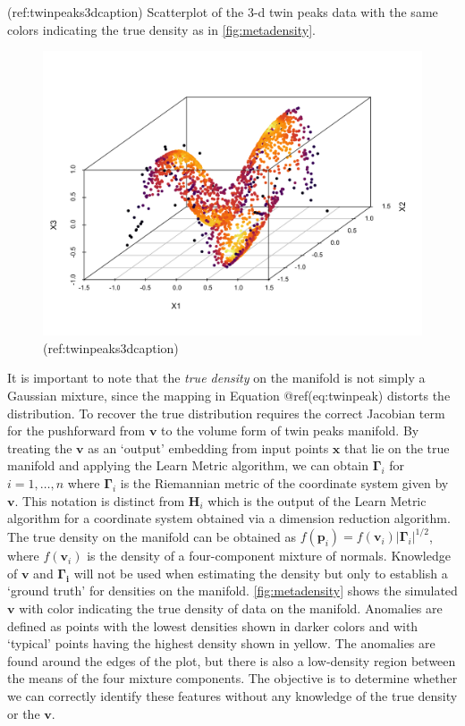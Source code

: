\documentclass[
]{article}
\begin{document}
(ref:twinpeaks3dcaption) Scatterplot of the 3-d twin peaks data with the
same colors indicating the true density as in \autoref{fig:metadensity}.

\begin{figure}

{\centering \includegraphics[width=0.75\linewidth]{figures/scatterplot3d_twinpeaks_dc} 

}

\caption{(ref:twinpeaks3dcaption)}\label{fig:twinpeaks3d}
\end{figure}

It is important to note that the \emph{true density} on the manifold is
not simply a Gaussian mixture, since the mapping in Equation
@ref(eq:twinpeak) distorts the distribution. To recover the true
distribution requires the correct Jacobian term for the pushforward from
\(\bm{v}\) to the volume form of twin peaks manifold. By treating the
\(\bm{v}\) as an `output' embedding from input points \(\bm{x}\) that
lie on the true manifold and applying the Learn Metric algorithm, we can
obtain \(\bm{\Gamma}_i\) for \(i=1,\dots,n\) where \(\bm{\Gamma}_i\) is
the Riemannian metric of the coordinate system given by \(\bm{v}\). This
notation is distinct from \(\bm{H}_i\) which is the output of the Learn
Metric algorithm for a coordinate system obtained via a dimension
reduction algorithm. The true density on the manifold can be obtained as
\(f(\bm{p}_i)=f(\bm{v}_i)|\bm{\Gamma}_i|^{1/2}\), where \(f(\bm{v}_i)\)
is the density of a four-component mixture of normals. Knowledge of
\(\bm{v}\) and \(\bm{\Gamma_i}\) will not be used when estimating the
density but only to establish a `ground truth' for densities on the
manifold. \autoref{fig:metadensity} shows the simulated \(\bm{v}\) with
color indicating the true density of data on the manifold. Anomalies are
defined as points with the lowest densities shown in darker colors and
with `typical' points having the highest density shown in yellow. The
anomalies are found around the edges of the plot, but there is also a
low-density region between the means of the four mixture components. The
objective is to determine whether we can correctly identify these
features without any knowledge of the true density or the \(\bm{v}\).
\end{document}
